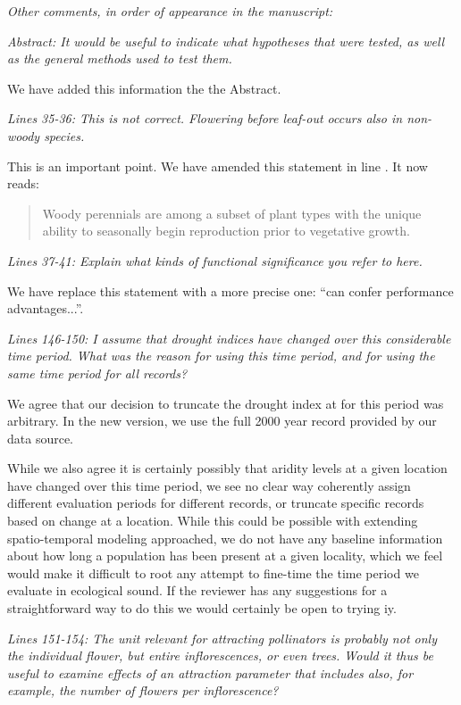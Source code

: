 \documentclass{article}[12pt]
\begin{document}
\emph{Other comments, in order of appearance in the manuscript:}

\emph{Abstract: It would be useful to indicate what hypotheses that were tested, as well as the general methods used to test them.}

We have added this information the the Abstract.

\emph{Lines 35-36: This is not correct. Flowering before leaf-out occurs also in non-woody species.}


This is an important point. We have amended this statement in line . It now reads:
\begin{quote} Woody perennials are among a subset of plant types with the unique ability to seasonally begin reproduction prior to vegetative growth.\end{quote}

\emph{Lines 37-41: Explain what kinds of functional significance you refer to here.}

We have replace this statement with a more precise one: ``can confer performance advantages...''.

\emph{Lines 146-150: I assume that drought indices have changed over this considerable time period. What was the reason for using this time period, and for using the same time period for all records?}

We agree that our decision to truncate the drought index at for this period was arbitrary. In the new version, we use the full 2000 year record provided by our data source.

While we also agree it is certainly possibly that aridity levels at a given location have changed over this time period, we see no clear way coherently assign different evaluation periods for different records, or truncate specific records based on change at a location. While this could be possible with extending spatio-temporal modeling approached, we do not have any baseline information about how long a population has been present at a given locality, which we feel would make it difficult to root any attempt to fine-time the time period we evaluate in ecological sound. If the reviewer has any suggestions for a straightforward way to do this we would certainly be open to trying iy.


\emph{Lines 151-154: The unit relevant for attracting pollinators is probably not only the individual flower, but entire inflorescences, or even trees. Would it thus be useful to examine effects of an attraction parameter that includes also, for example, the number of flowers per inflorescence?}
\end{document}
